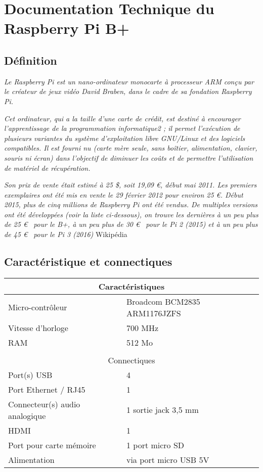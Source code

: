 
\chapter{Documentation Technique du Raspberry Pi B+}
\label{annexe:rpi}

\section{Définition}


\textit{\og Le Raspberry Pi est un nano-ordinateur monocarte à processeur ARM conçu par le créateur de jeux vidéo David Braben, dans le cadre de sa fondation Raspberry Pi.}

\textit{Cet ordinateur, qui a la taille d'une carte de crédit, est destiné à encourager l'apprentissage de la programmation informatique2 ; il permet l'exécution de plusieurs variantes du système d'exploitation libre GNU/Linux et des logiciels compatibles. Il est fourni nu (carte mère seule, sans boîtier, alimentation, clavier, souris ni écran) dans l'objectif de diminuer les coûts et de permettre l'utilisation de matériel de récupération.}

\textit{Son prix de vente était estimé à 25 \$, soit 19,09 \euro, début mai 2011. Les premiers exemplaires ont été mis en vente le 29 février 2012 pour environ 25 \euro. Début 2015, plus de cinq millions de Raspberry Pi ont été vendus. De multiples versions ont été développées (voir la liste ci-dessous), on trouve les dernières à un peu plus de 25 \euro~ pour le B+, à un peu plus de 30 \euro~ pour le Pi 2 (2015) et à un peu plus de 45 \euro~ pour le Pi 3 (2016)\fg{}} Wikipédia \cite{wiki_rpi}

\section{Caractéristique et connectiques}
\begin{tabular}[c]{|l|l|}
\hline
\multicolumn{2}{|c|}{Caractéristiques}\\
\hline
Micro-contrôleur &	Broadcom BCM2835 ARM1176JZFS\\
Vitesse d'horloge& 	700 MHz\\
RAM &	512 Mo\\
\hline
\multicolumn{2}{c}{}\\
\hline
\multicolumn{2}{|c|}{Connectiques}\\
\hline
Port(s) USB &	4\\
Port Ethernet / RJ45 &	1\\
Connecteur(s) audio analogique &	1 sortie jack 3,5 mm\\
HDMI 	&1\\
Port pour carte mémoire 	&1 port micro SD\\
Alimentation &	via port micro USB 5V\\
\hline
\end{tabular}

